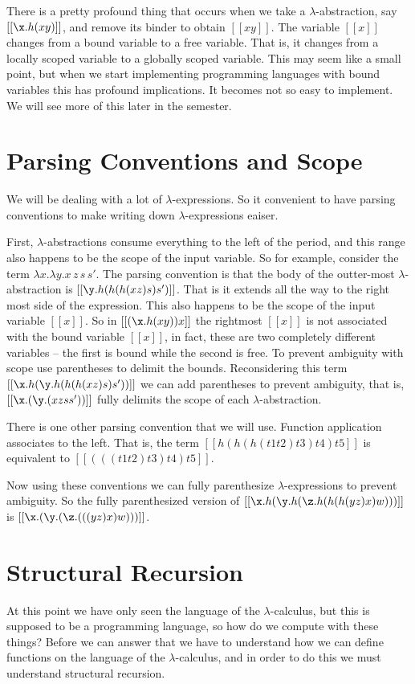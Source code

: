 \documentclass{article}
\begin{document}
There is a pretty profound thing that occurs when we take a
$\lambda$-abstraction, say $[[\x.h(x y)]]$, and remove its binder to
obtain $[[x y]]$.  The variable $[[x]]$ changes from a bound variable
to a free variable.  That is, it changes from a locally scoped
variable to a globally scoped variable.  This may seem like a small
point, but when we start implementing programming languages with bound
variables this has profound implications.  It becomes not so easy to
implement.  We will see more of this later in the semester.

\section{Parsing Conventions and Scope}
\label{sec:parsing_conventions}
We will be dealing with a lot of $\lambda$-expressions.  So it
convenient to have parsing conventions to make writing down
$\lambda$-expressions eaiser.  

First, $\lambda$-abstractions consume everything to the left of the
period, and this range also happens to be the scope of the input
variable.  So for example, consider the term $\lambda x.\lambda y.x\,z\,s\,s'$.
The parsing convention is that the body of the outter-most
$\lambda$-abstraction is $[[\y.h(h(h(x z) s) s')]]$.  That is it extends all
the way to the right most side of the expression.  This also happens
to be the scope of the input variable $[[x]]$.  So in $[[(\x.h(x y)) x]]$
the rightmost $[[x]]$ is not associated with the bound variable
$[[x]]$, in fact, these are two completely different variables -- the
first is bound while the second is free.  To prevent ambiguity with
scope use parentheses to delimit the bounds.  Reconsidering this term
$[[\x.h(\y.h(h(h(x z) s) s'))]]$ we can add parentheses to prevent ambiguity, that
is, $[[\x.(\y.(x z s s'))]]$ fully delimits the scope of each
$\lambda$-abstraction.

There is one other parsing convention that we will use.  Function
application associates to the left.  That is, the term $[[h(h(h(t1 t2)
t3) t4) t5]]$ is equivalent to $[[(((t1 t2) t3) t4) t5]]$.  

Now using these conventions we can fully parenthesize
$\lambda$-expressions to prevent ambiguity.  So the fully
parenthesized version of $[[\x.h(\y.h(\z.h(h(h(y z) x) w)))]]$ is
$[[\x.(\y.(\z.(((y z) x) w)))]]$.

\section{Structural Recursion}
\label{sec:induction_and_recursion}
At this point we have only seen the language of the
$\lambda$-calculus, but this is supposed to be a programming language,
so how do we compute with these things?  Before we can answer that we
have to understand how we can define functions on the language of the
$\lambda$-calculus, and in order to do this we must understand
structural recursion.
\end{document}
